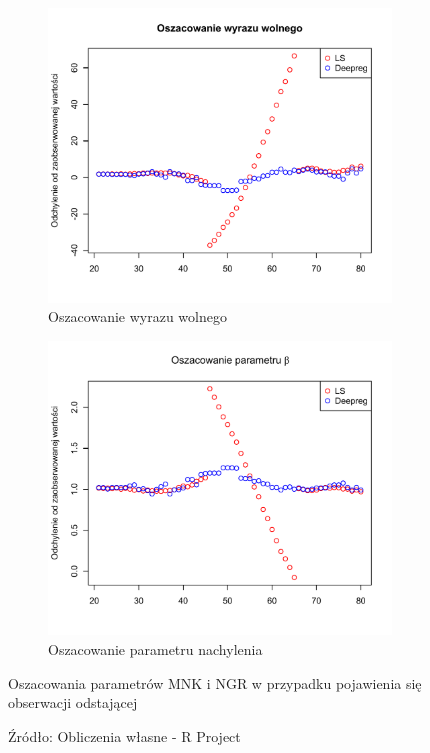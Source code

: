 \documentclass[man,mfu]{mgrwms}
\begin{document}
\begin{figure}[H]
\centering
\begin{subfigure}[t]{0.40\textwidth}
  \includegraphics[width=\linewidth]{interceptout}
  \caption{Oszacowanie wyrazu wolnego}
  \label{fig:interceptout}
\end{subfigure}
\begin{subfigure}[t]{0.40\textwidth}
  \includegraphics[width=\linewidth]{betaout}
  \caption{Oszacowanie parametru nachylenia}
  \label{fig:betaout}
\end{subfigure}
\caption{Oszacowania parametrów MNK i NGR w przypadku pojawienia się obserwacji odstającej}
\caption*{Źródło: Obliczenia własne - R Project}
\end{figure}
\end{document}
